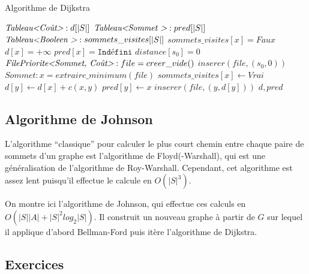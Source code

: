 \documentclass[../../../main.tex]{subfiles}
\begin{document}
\begin{algorithm}
\caption{Algorithme de Dijkstra\label{alg:dijkstra}}
$\textit{Tableau\textless{}Coût\textgreater}: d[|S|]$
$\textit{Tableau\textless{}Sommet \textgreater}: pred[|S|]$
$\textit{Tableau\textless{}Booleen \textgreater}: sommets\_visites[|S|]$\;
 {
	$sommets\_visites[x] = \textit{Faux}$\;
	$d[x] = +\infty$\;
	$pred[x] = \texttt{Indéfini}$
}
$distance[s_0] = 0$\;
$\textit{FilePriorite\textless{}Sommet, Coût\textgreater}:file = creer\_vide()$ 
$inserer(file, (s_0, 0))$\;
 {
	$Sommet:x = extraire\_minimum(file)$
	$sommets\_visites[x]\leftarrow \textit{Vrai}$\;
	 {
		 {
			$d[y] \leftarrow d[x] + c(x, y)$\;
			$pred[y] \leftarrow x$\;
			 {
				$inserer(file, (y, d[y]))$\;
			}
		}
	}
}
\Return $d, pred$\;
\end{algorithm}

\subsection{Algorithme de Johnson}
L'algorithme ``classique'' pour calculer le plus court chemin entre chaque paire de sommets d'un graphe est l'algorithme de Floyd(-Warshall), qui est une généralisation de l'algorithme de Roy-Warshall. Cependant, cet algorithme est assez lent puisqu'il effectue le calcule en $O(|S|^3)$.

On montre ici l'algorithme de Johnson, qui effectue ces calculs en $O(|S||A| + |S|^2log_2|S|)$. Il construit un nouveau graphe à partir de $G$ sur lequel il applique d'abord Bellman-Ford puis itère l'algorithme de Dijkstra. 
\subsection{Exercices}
\end{document}
